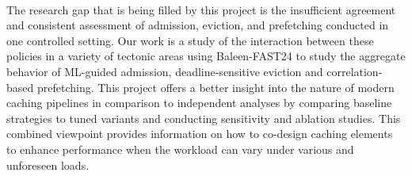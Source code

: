 \documentclass[sigconf]{acmart}
\begin{document}
{\\The research gap that is being filled by this project is the insufficient agreement and consistent assessment of admission, eviction, and prefetching conducted in one controlled setting. Our work is a study of the interaction between these policies in a variety of tectonic areas using Baleen-FAST24 to study the aggregate behavior of ML-guided admission, deadline-sensitive eviction and correlation-based prefetching. This project offers a better insight into the nature of modern caching pipelines in comparison to independent analyses by comparing baseline strategies to tuned variants and conducting sensitivity and ablation studies. This combined viewpoint provides information on how to co-design caching elements to enhance performance when the workload can vary under various and unforeseen loads.

\clearpage
}
\end{document}
